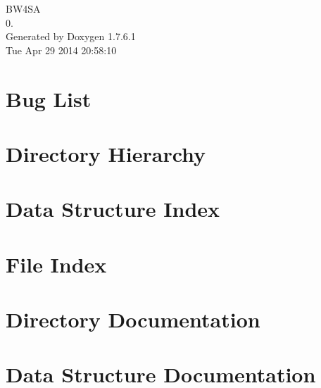 \documentclass[a4paper]{book}
\begin{document}
\hypersetup{pageanchor=false,citecolor=blue}
\begin{titlepage}
\vspace*{7cm}
\begin{center}
{\Large \-B\-W4\-S\-A \\[1ex]\large 0. }\\
\vspace*{1cm}
{\large \-Generated by Doxygen 1.7.6.1}\\
\vspace*{0.5cm}
{\small Tue Apr 29 2014 20:58:10}\\
\end{center}
\end{titlepage}
\clearemptydoublepage
{}
\tableofcontents
\clearemptydoublepage
{}
\hypersetup{pageanchor=true,citecolor=blue}
\chapter{\-Bug \-List}
\label{bug}
\hypertarget{bug}{}

\chapter{\-Directory \-Hierarchy}

\chapter{\-Data \-Structure \-Index}

\chapter{\-File \-Index}

\chapter{\-Directory \-Documentation}





\chapter{\-Data \-Structure \-Documentation}



\end{document}
